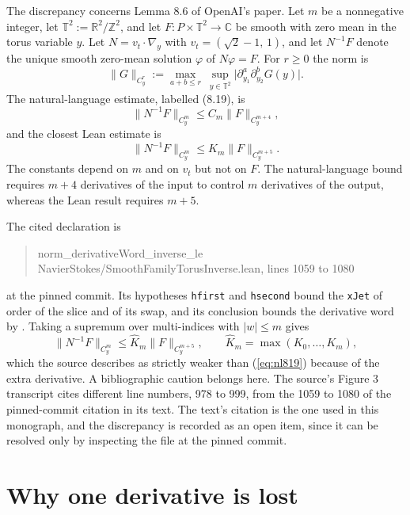 The discrepancy concerns Lemma 8.6 of OpenAI's paper. Let $m$ be a nonnegative integer, let $\mathbb{T}^2 := \mathbb{R}^2/\mathbb{Z}^2$, and let $F : P \times \mathbb{T}^2 \to \mathbb{C}$ be smooth with zero mean in the torus variable $y$. Let $N = v_t \cdot \nabla_y$ with $v_t = (\sqrt{2} - 1,\, 1)$, and let $N^{-1}F$ denote the unique smooth zero-mean solution $\varphi$ of $N\varphi = F$. For $r \ge 0$ the norm is
\[
\|G\|_{C^r_y} := \max_{a + b \le r}\ \sup_{y \in \mathbb{T}^2} \bigl| \partial_{y_1}^a \partial_{y_2}^b G(y) \bigr| .
\]
The natural-language estimate, labelled (8.19), is
\begin{equation}
\|N^{-1}F\|_{C^m_y} \le C_m \|F\|_{C^{m+4}_y},
\label{eq:nl819}
\end{equation}
and the closest Lean estimate is
\begin{equation}
\|N^{-1}F\|_{C^m_y} \le K_m \|F\|_{C^{m+5}_y}.
\label{eq:lean819}
\end{equation}
The constants depend on $m$ and on $v_t$ but not on $F$. The natural-language bound requires $m+4$ derivatives of the input to control $m$ derivatives of the output, whereas the Lean result requires $m+5$.

The cited declaration is
\begin{quote}
\small\ttfamily norm\_derivativeWord\_inverse\_le\\
NavierStokes/SmoothFamilyTorusInverse.lean, lines 1059 to 1080
\end{quote}
at the pinned commit. Its hypotheses \texttt{hfirst} and \texttt{hsecond} bound the \texttt{xJet} of order  of the slice and of its swap, and its conclusion bounds the derivative word by . Taking a supremum over multi-indices with $|w| \le m$ gives
\[
\|N^{-1}F\|_{C^m_y} \le \hat{K}_m \|F\|_{C^{m+5}_y}, \qquad \hat{K}_m = \max(K_0, \dots, K_m),
\]
which the source describes as strictly weaker than (\ref{eq:nl819}) because of the extra derivative. A bibliographic caution belongs here. The source's Figure 3 transcript cites different line numbers, 978 to 999, from the 1059 to 1080 of the pinned-commit citation in its text. The text's citation is the one used in this monograph, and the discrepancy is recorded as an open item, since it can be resolved only by inspecting the file at the pinned commit.

\section{Why one derivative is lost}

